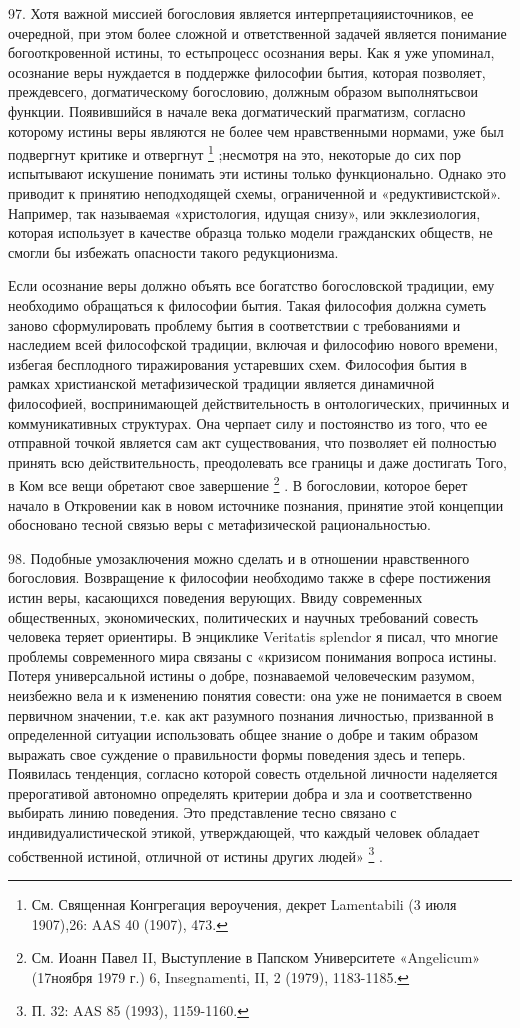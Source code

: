 \documentclass[a5paper,10pt]{article}
\begin{document}
97. Хотя важной миссией богословия является интерпретацияисточников, ее
очередной, при этом более сложной и ответственной задачей является понимание
богооткровенной истины, то естьпроцесс осознания веры. Как я уже упоминал,
осознание веры нуждается в поддержке философии бытия, которая позволяет,
преждевсего, догматическому богословию, должным образом выполнятьсвои функции.
Появившийся в начале века догматический прагматизм, согласно которому истины
веры являются не более чем нравственными нормами, уже был подвергнут критике и
отвергнут \footnote{См. Священная Конгрегация вероучения, декрет Lamentabili (3
июля 1907),26: AAS 40 (1907), 473.} ;несмотря на это, некоторые до сих пор
испытывают искушение понимать эти истины только функционально. Однако это
приводит к принятию неподходящей схемы, ограниченной и «редуктивистской».
Например, так называемая «христология, идущая снизу», или экклезиология,
которая использует в качестве образца только модели гражданских обществ, не
смогли бы избежать опасности такого редукционизма.

Если осознание веры должно объять все богатство богословской традиции, ему
необходимо обращаться к философии бытия. Такая философия должна суметь заново
сформулировать проблему бытия в соответствии с требованиями и наследием всей
философской традиции, включая и философию нового времени, избегая бесплодного
тиражирования устаревших схем. Философия бытия в рамках христианской
метафизической традиции является динамичной философией, воспринимающей
действительность в онтологических, причинных и коммуникативных структурах. Она
черпает силу и постоянство из того, что ее отправной точкой является сам акт
существования, что позволяет ей полностью принять всю действительность,
преодолевать все границы и даже достигать Того, в Ком все вещи обретают свое
завершение \footnote{См. Иоанн Павел II, Выступление в Папском Университете
«Angelicum» (17ноября 1979 г.) 6, Insegnamenti, II, 2 (1979), 1183-1185.} . В
богословии, которое берет начало в Откровении как в новом источнике познания,
принятие этой концепции обосновано тесной связью веры с метафизической
рациональностью.

98. Подобные умозаключения можно сделать и в отношении нравственного
богословия. Возвращение к философии необходимо также в сфере постижения истин
веры, касающихся поведения верующих. Ввиду современных общественных,
экономических, политических и научных требований совесть человека теряет
ориентиры. В энциклике Veritatis splendor я писал, что многие проблемы
современного мира связаны с «кризисом понимания вопроса истины. Потеря
универсальной истины о добре, познаваемой человеческим разумом, неизбежно вела
и к изменению понятия совести: она уже не понимается в своем первичном
значении, т.е. как акт разумного познания личностью, призванной в определенной
ситуации использовать общее знание о добре и таким образом выражать свое
суждение о правильности формы поведения здесь и теперь. Появилась тенденция,
согласно которой совесть отдельной личности наделяется прерогативой автономно
определять критерии добра и зла и соответственно выбирать линию поведения. Это
представление тесно связано с индивидуалистической этикой, утверждающей, что
каждый человек обладает собственной истиной, отличной от истины других людей»
\footnote{П. 32: AAS 85 (1993), 1159-1160.} .
\end{document}
